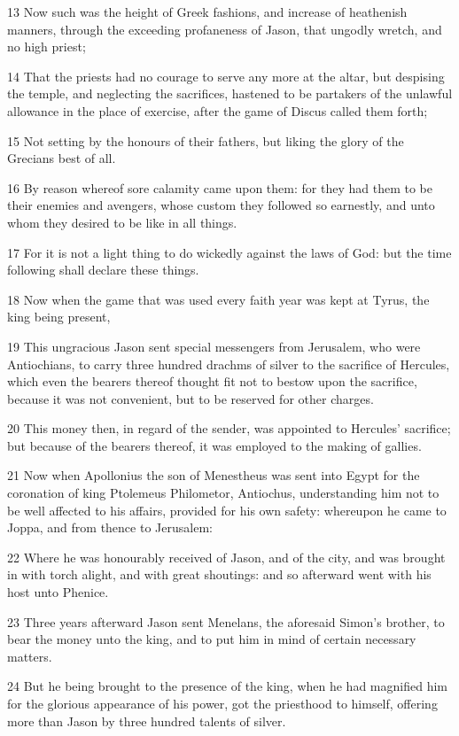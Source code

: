 \par 13 Now such was the height of Greek fashions, and increase of heathenish manners, through the exceeding profaneness of Jason, that ungodly wretch, and no high priest;
\par 14 That the priests had no courage to serve any more at the altar, but despising the temple, and neglecting the sacrifices, hastened to be partakers of the unlawful allowance in the place of exercise, after the game of Discus called them forth;
\par 15 Not setting by the honours of their fathers, but liking the glory of the Grecians best of all.
\par 16 By reason whereof sore calamity came upon them: for they had them to be their enemies and avengers, whose custom they followed so earnestly, and unto whom they desired to be like in all things.
\par 17 For it is not a light thing to do wickedly against the laws of God: but the time following shall declare these things.
\par 18 Now when the game that was used every faith year was kept at Tyrus, the king being present,
\par 19 This ungracious Jason sent special messengers from Jerusalem, who were Antiochians, to carry three hundred drachms of silver to the sacrifice of Hercules, which even the bearers thereof thought fit not to bestow upon the sacrifice, because it was not convenient, but to be reserved for other charges.
\par 20 This money then, in regard of the sender, was appointed to Hercules' sacrifice; but because of the bearers thereof, it was employed to the making of gallies.
\par 21 Now when Apollonius the son of Menestheus was sent into Egypt for the coronation of king Ptolemeus Philometor, Antiochus, understanding him not to be well affected to his affairs, provided for his own safety: whereupon he came to Joppa, and from thence to Jerusalem:
\par 22 Where he was honourably received of Jason, and of the city, and was brought in with torch alight, and with great shoutings: and so afterward went with his host unto Phenice.
\par 23 Three years afterward Jason sent Menelans, the aforesaid Simon's brother, to bear the money unto the king, and to put him in mind of certain necessary matters.
\par 24 But he being brought to the presence of the king, when he had magnified him for the glorious appearance of his power, got the priesthood to himself, offering more than Jason by three hundred talents of silver.
